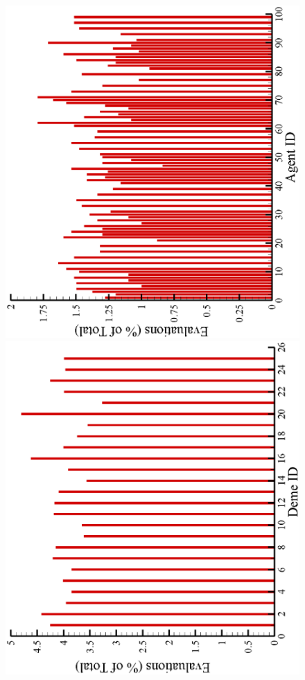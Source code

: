 \documentclass{vki_ls}
\begin{document}
\begin{figure}[h!]
\centering
    \begin{minipage}{.49\linewidth}
       \includegraphics[angle=-90,scale=0.4]{amaea/agent_evals.eps}
    \end{minipage}
    \begin{minipage}{.49\linewidth}
       \includegraphics[angle=-90,scale=0.4]{amaea/demes_evals.eps}

\end{minipage}
\end{figure}
\end{document}
